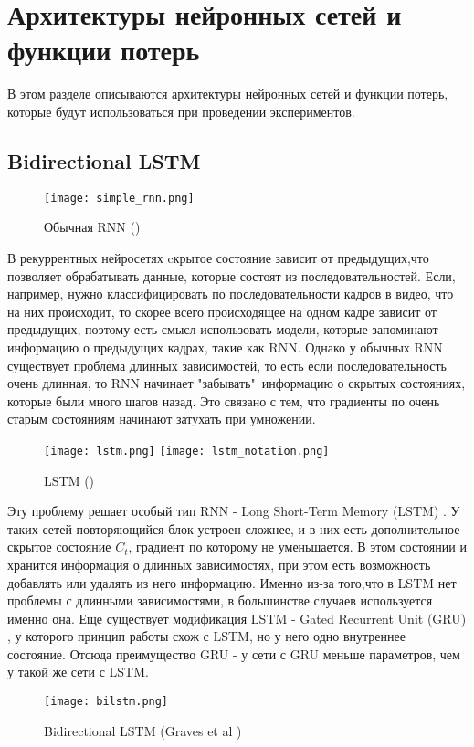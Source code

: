 \documentclass[a4paper,14pt]{extarticle}
\begin{document}
\section{Архитектуры нейронных сетей и функции потерь}
В этом разделе описываются архитектуры нейронных сетей и функции потерь, которые будут использоваться при проведении экспериментов. 
\subsection{Bidirectional LSTM}
\begin{figure}[!ht]
	\texttt{[image: simple\_rnn.png]}%
	\caption{Обычная RNN (\cite{understanding_lstm})}
	\label{simple_rnn}
\end{figure}
В рекуррентных нейросетях cкрытое состояние зависит от предыдущих,что позволяет обрабатывать данные, которые состоят из последовательностей. Если, например, нужно классифицировать по последовательности кадров в видео, что на них происходит, то скорее всего происходящее на одном кадре зависит от предыдущих, поэтому есть смысл использовать модели, которые запоминают информацию о предыдущих кадрах, такие как RNN. Однако у обычных RNN существует проблема длинных зависимостей, то есть если последовательность очень длинная, то RNN начинает "забывать"\ информацию о скрытых состояниях, которые были много шагов назад. Это связано с тем, что градиенты по очень старым состояниям начинают затухать при умножении. 
\begin{figure}[!ht]
	\texttt{[image: lstm.png]}
	\texttt{[image: lstm\_notation.png]}
	\caption{LSTM (\cite{understanding_lstm})}
	\label{lstm}
\end{figure}

Эту проблему решает особый тип RNN - Long Short-Term Memory (LSTM) \cite{lstm}. У таких сетей повторяющийся блок устроен сложнее, и в них есть дополнительное скрытое состояние $C_t$, градиент по которому не уменьшается. В этом состоянии и хранится информация о длинных зависимостях, при этом есть возможность добавлять или удалять из него информацию. Именно из-за того,что в LSTM нет проблемы с длинными зависимостями, в большинстве случаев используется именно она.  Еще существует  модификация LSTM - Gated Recurrent Unit (GRU) \cite{gru}, у которого принцип работы схож с LSTM, но у него одно внутреннее состояние. Отсюда преимущество GRU - у сети с GRU меньше параметров, чем у такой же сети с LSTM.
\begin{figure}[!ht]
	\texttt{[image: bilstm.png]}%
	\caption{Bidirectional LSTM (Graves et al \cite{graves2006connectionist})}
	\label{simple_rnn}
\end{figure}
\end{document}
